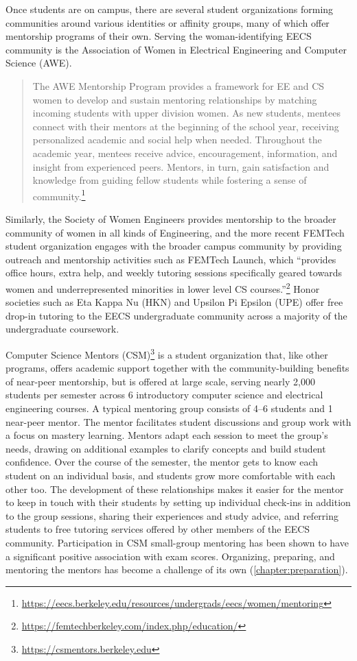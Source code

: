 Once students are on campus, there are several student organizations forming communities around various identities or affinity groups, many of which offer mentorship programs of their own. Serving the woman-identifying EECS community is the Association of Women in Electrical Engineering and Computer Science (AWE).
\begin{quote}
    The AWE Mentorship Program provides a framework for EE and CS women to develop and sustain mentoring relationships by matching incoming students with upper division women. As new students, mentees connect with their mentors at the beginning of the school year, receiving personalized academic and social help when needed. Throughout the academic year, mentees receive advice, encouragement, information, and insight from experienced peers. Mentors, in turn, gain satisfaction and knowledge from guiding fellow students while fostering a sense of community.\footnote{\url{https://eecs.berkeley.edu/resources/undergrads/eecs/women/mentoring}}
\end{quote}
Similarly, the Society of Women Engineers provides mentorship to the broader community of women in all kinds of Engineering, and the more recent FEMTech student organization engages with the broader campus community by providing outreach and mentorship activities such as FEMTech Launch, which ``provides office hours, extra help, and weekly tutoring sessions specifically geared towards women and underrepresented minorities in lower level CS courses.''\footnote{\url{https://femtechberkeley.com/index.php/education/}} Honor societies such as Eta Kappa Nu (HKN) and Upsilon Pi Epsilon (UPE) offer free drop-in tutoring to the EECS undergraduate community across a majority of the undergraduate coursework.

Computer Science Mentors (CSM)\footnote{\url{https://csmentors.berkeley.edu}} is a student organization that, like other programs, offers academic support together with the community-building benefits of near-peer mentorship, but is offered at large scale, serving nearly 2,000 students per semester across 6 introductory computer science and electrical engineering courses. A typical mentoring group consists of 4--6 students and 1 near-peer mentor. The mentor facilitates student discussions and group work with a focus on mastery learning. Mentors adapt each session to meet the group's needs, drawing on additional examples to clarify concepts and build student confidence. Over the course of the semester, the mentor gets to know each student on an individual basis, and students grow more comfortable with each other too. The development of these relationships makes it easier for the mentor to keep in touch with their students by setting up individual check-ins in addition to the group sessions, sharing their experiences and study advice, and referring students to free tutoring services offered by other members of the EECS community. Participation in CSM small-group mentoring has been shown to have a significant positive association with exam scores. Organizing, preparing, and mentoring the mentors has become a challenge of its own (\autoref{chapter:preparation}).